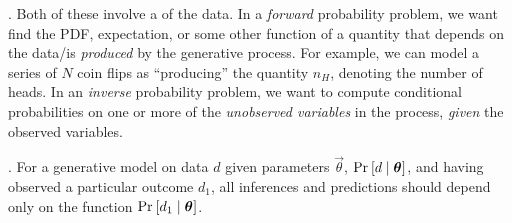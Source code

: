 \documentclass[11pt]{article}
\begin{document}
\myspace
\p {}. Both of these involve a  of the data. In a \textit{forward} probability problem, we want find the PDF, expectation, or some other function of a quantity that depends on the data/is \textit{produced} by the generative process. For example, we can model a series of $N$ coin flips as ``producing'' the quantity $n_H$, denoting the number of heads. In an \textit{inverse} probability problem, we want to compute conditional probabilities on one or more of the \textit{unobserved variables} in the process, \textit{given} the observed variables. 

\myspace
\p {}. For a generative model on data $d$ given parameters $\vec\theta$, $\text{Pr}_{}\left[d \mid \bm{\theta}_{}\right]$, and having observed a particular outcome $d_1$, all inferences and predictions should depend only on the function $\text{Pr}_{}\left[d_1 \mid \bm{\theta}_{}\right]$. 
\end{document}
